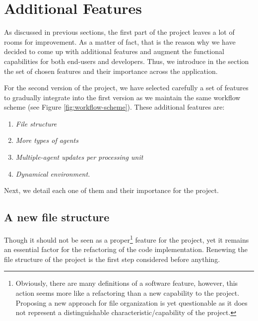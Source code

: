 %
%
%
%

\section{Additional Features}\label{sec:features}
As discussed in previous sections, the first part of the project leaves a lot of rooms for improvement. As a matter of fact, that is the reason why we have decided to come up with additional features and augment the functional capabilities for both end-users and developers. Thus, we introduce in the section the set of chosen features and their importance across the application.

For the second version of the project, we have selected carefully  a set of features to gradually integrate into the first version as we maintain the same workflow scheme (see Figure \ref{fig:workflow-scheme}). These additional features are:
\begin{enumerate}
    \item \textit{File structure}
    \item \textit{More types of agents}
    \item \textit{Multiple-agent updates per processing unit}
    \item \textit{Dynamical environment.}
\end{enumerate}

\noindent
Next, we detail each one of them and their importance for the project.

\subsection{A new file structure}
Though it should not be seen as a proper\footnote{Obviously, there are many definitions of a software feature, however, this action seems more like a refactoring than a new capability to the project. Proposing a new approach for file organization is yet questionable as it does not represent a distinguishable characteristic/capability of the project.} feature for the project, yet it remains an essential factor for the refactoring of the code implementation. Renewing the file structure of the project is the first step considered before anything.

